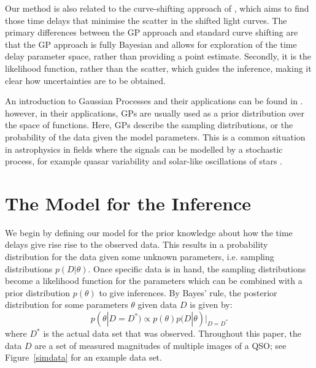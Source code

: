 \documentclass[useAMS,usenatbib, a4paper]{mn2e} \usepackage{natbib}
\begin{document}
Our method is also related to the curve-shifting approach of
\citet{1996A&A...305...97P}, which aims to find those time delays that
minimise the scatter in the shifted light curves. The primary differences
between the GP approach and standard curve shifting are that the GP approach
is fully Bayesian and allows for exploration of the time delay parameter
space, rather than providing a point estimate. Secondly, it is the likelihood
function, rather than the scatter, which guides the inference, making it clear
how uncertainties are to be obtained. 

An introduction to Gaussian Processes and their applications can be found in
\citet{rasmussen}. however, in their applications, GPs are usually used as a
prior distribution over the space of functions. Here, GPs describe the
sampling distributions, or the probability of the data given the model
parameters. This is a common situation in astrophysics in fields where the
signals can be modelled by a stochastic process, for example quasar
variability \citep{2009ApJ...698..895K, 2010ApJ...721.1014M, 2011ApJ...735...80Z} and solar-like
oscillations of stars \citep{2009MNRAS.395.2226B}.



\section{The Model for the Inference}

We begin by defining our model for the prior knowledge about how the time
delays give rise rise to the observed data. This results in a probability
distribution for the data given some unknown parameters, i.e. sampling
distributions $p(D|\theta)$. Once specific data is in hand, the sampling
distributions become a likelihood function for the parameters which can be
combined with a prior distribution $p(\theta)$ to give inferences. By Bayes'
rule, the posterior distribution for some parameters $\theta$ given data $D$
is given by:
\begin{equation}
p(\theta|D = D^*) \propto p(\theta)p(D|\theta)|_{D = D^*}
\end{equation}
where $D^*$ is the actual data set that was observed. Throughout this paper,
the data $D$ are a set of measured magnitudes of multiple images of a QSO; see
Figure~\ref{simdata} for an example data set.
\end{document}
